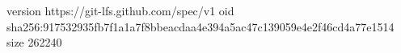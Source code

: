 version https://git-lfs.github.com/spec/v1
oid sha256:917532935fb7f1a1a7f8bbeacdaa4e394a5ac47c139059e4e2f46cd4a77e1514
size 262240
